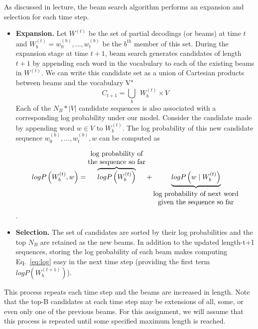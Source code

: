 \documentclass[a4paper,10pt]{article}
\begin{document}
As discussed in lecture, the beam search algorithm performs an expansion and selection for each time step.
%
\begin{itemize}
    \item \textbf{Expansion.} Let $W^{(t)}$ be the set of partial decodings (or beams) at time $t$ and $W^{(t)}_b = w_0^{(b)}, ..., w_t^{(b)}$ be the $b^{th}$ member of this set. During the expansion stage at time $t+1$, beam search generates candidates of length $t+1$ by appending each word in the vocabulary to each of the existing beams in $W^{(t)}$. We can write this candidate set as a union of Cartesian products between beams and the vocabulary V"
    \begin{equation}
     C_{t+1} = \bigcup\limits_{b}~~W_b^{(t)} \times V   
    \end{equation}
    Each of the $N_B*|V|$ candidate sequences is also associated with a corresponding log probability under our model. Consider the candidate made by appending word $w \in V$ to $W_b^{(t)}$. The log probability of this new candidate sequence $w_0^{(b)}, ..., w_t^{(b)}, w$ can be computed as 
    
    \begin{equation}
        logP\left(W_b^{(t)}, w\right) = \overbrace{logP\left(W_b^{(t)}\right)}^{\mbox{\shortstack{log probability of \\ the sequence so far}}} + \underbrace{logP\left(w \mid W_b^{(t)}\right)}_{_{\mbox{\shortstack{log probability of next word\\  given the sequence so far}}}}
        \label{eq:log}
    \end{equation}. 
    
    \item \textbf{Selection.} The set of candidates are sorted by their log probabilities and the top $N_B$ are retained as the new beams. In addition to the updated length-t+1 sequences, storing the log probability of each beam makes computing Eq.~\ref{eq:log} easy in the next time step (providing the first term $logP(W_b^{(t+1)})$).
\end{itemize}
%
This process repeats each time step and the beams are increased in length. Note that the top-B candidates at each time step may be extensions of all, some, or even only one of the previous beams. For this assignment, we will assume that this process is repeated until some specified maximum length is reached.
\end{document}
